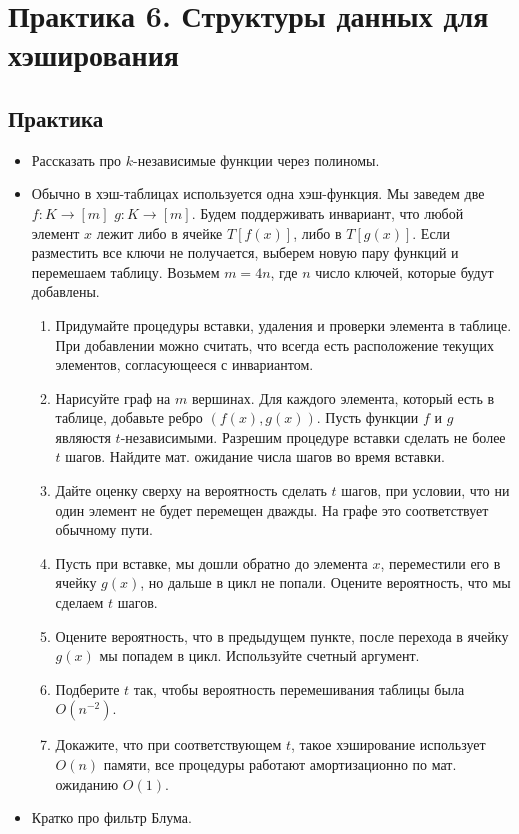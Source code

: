 \section{Практика 6. Структуры данных для хэширования}

\subsection{Практика}

\begin{itemize}
  \item Рассказать про $k$-независимые функции через полиномы.
  
 
  \item Обычно в хэш-таблицах используется одна хэш-функция. Мы заведем две $f : K \rightarrow [m]$
   $g : K \rightarrow [m]$. Будем поддерживать инвариант, что любой элемент $x$ лежит либо в ячейке
    $T[f(x)]$, либо в $T[g(x)]$. Если разместить все ключи не получается, выберем
    новую пару функций и перемешаем таблицу. Возьмем $m = 4n$, где $n$ число ключей,
    которые будут добавлены.

    \begin{enumerate}
      \item Придумайте процедуры вставки, удаления и проверки элемента в 
        таблице. При добавлении можно считать, что всегда есть расположение текущих
        элементов, согласующееся с инвариантом.

      \item Нарисуйте граф на $m$ вершинах. Для каждого элемента, который есть в таблице,
        добавьте ребро $(f(x), g(x))$. Пусть функции $f$ и $g$ являюстя $t$-независимыми.
        Разрешим процедуре вставки сделать не более $t$ шагов. Найдите мат. ожидание
        числа шагов во время вставки.

      \item Дайте оценку сверху на вероятность сделать $t$ шагов, при условии, что ни 
        один элемент не будет перемещен дважды. На графе это соответствует обычному пути.

      \item Пусть при вставке, мы дошли обратно до элемента $x$, переместили его в ячейку
        $g(x)$, но дальше в цикл не попали. Оцените вероятность, что мы сделаем $t$ шагов.
  
      \item Оцените вероятность, что в предыдущем пункте, после перехода в ячейку $g(x)$
        мы попадем в цикл. Используйте счетный аргумент.

      \item Подберите $t$ так, чтобы вероятность перемешивания таблицы была $O(n^{-2})$.
      
      \item Докажите, что при соответствующем $t$, такое хэширование использует $O(n)$ памяти,
        все процедуры работают амортизационно по мат. ожиданию $O(1)$.
        
    \end{enumerate}
  
   \item Кратко про фильтр Блума.
    
\end{itemize}

